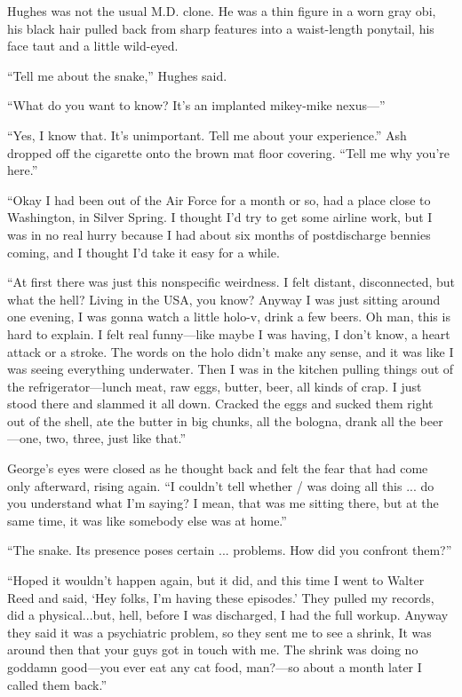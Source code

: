 Hughes was not the usual M.D. clone. He was a thin figure in a worn gray obi, his black hair pulled back from sharp features into a waist-length ponytail, his face taut and a little wild-eyed.

``Tell me about the snake,'' Hughes said.

``What do you want to know? It's an implanted mikey-mike nexus---''

``Yes, I know that. It's unimportant. Tell me about your experience.'' Ash dropped off the cigarette onto the brown mat floor covering. ``Tell me why you're here.''

``Okay I had been out of the Air Force for a month or so, had a place close to Washington, in Silver Spring. I thought I'd try to get some airline work, but I was in no real hurry because I had about six months of postdischarge bennies coming, and I thought I'd take it easy for a while.

``At first there was just this nonspecific weirdness. I felt distant, disconnected, but what the hell? Living in the USA, you know? Anyway I was just sitting around one evening, I was gonna watch a little holo-v, drink a few beers. Oh man, this is hard to explain. I felt real funny—like maybe I was having, I don't know, a heart attack or a stroke. The words on the holo didn't make any sense, and it was like I was seeing everything underwater. Then I was in the kitchen pulling things out of the refrigerator—lunch meat, raw eggs, butter, beer, all kinds of crap. I just stood there and slammed it all down. Cracked the eggs and sucked them right out of the shell, ate the butter in big chunks, all the bologna, drank all the beer—one, two, three, just like that.''

George's eyes were closed as he thought back and felt the fear that had come only afterward, rising again. ``I couldn't tell whether / was doing all this ... do you understand what I'm saying? I mean, that was me sitting there, but at the same time, it was like somebody else was at home.''

``The snake. Its presence poses certain ... problems. How did you confront them?''

``Hoped it wouldn't happen again, but it did, and this time I went to Walter Reed and said, ‘Hey folks, I'm having these episodes.' They pulled my records, did a physical...but, hell, before I was discharged, I had the full workup. Anyway they said it was a psychiatric problem, so they sent me to see a shrink, It was around then that your guys got in touch with me. The shrink was doing no goddamn good—you ever eat any cat food, man?—so about a month later I called them back.''

